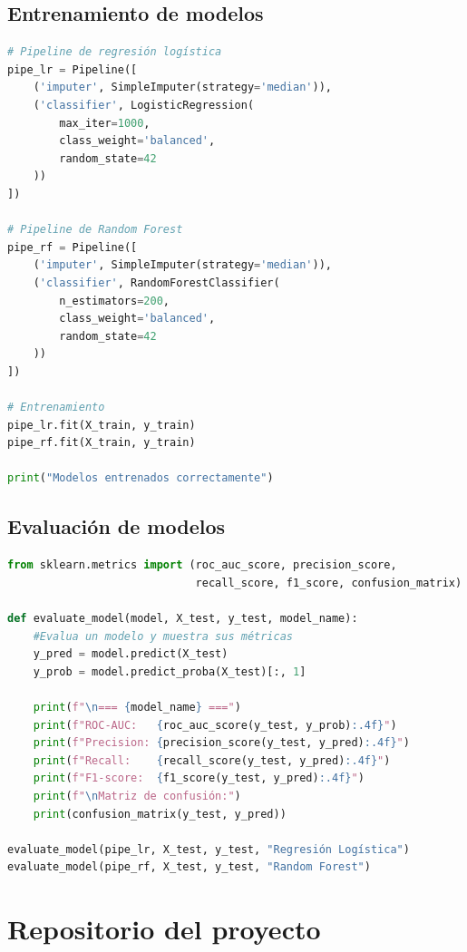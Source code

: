 \documentclass[12pt, a4paper, oneside]{report}
\begin{document}
\section{Entrenamiento de modelos}

\begin{lstlisting}[language=Python, caption=Configuración y entrenamiento de los modelos]
# Pipeline de regresión logística
pipe_lr = Pipeline([
    ('imputer', SimpleImputer(strategy='median')),
    ('classifier', LogisticRegression(
        max_iter=1000,
        class_weight='balanced',
        random_state=42
    ))
])

# Pipeline de Random Forest
pipe_rf = Pipeline([
    ('imputer', SimpleImputer(strategy='median')),
    ('classifier', RandomForestClassifier(
        n_estimators=200,
        class_weight='balanced',
        random_state=42
    ))
])

# Entrenamiento
pipe_lr.fit(X_train, y_train)
pipe_rf.fit(X_train, y_train)

print("Modelos entrenados correctamente")
\end{lstlisting}

\section{Evaluación de modelos}

\begin{lstlisting}[language=Python, caption=Cálculo de métricas de evaluación]
from sklearn.metrics import (roc_auc_score, precision_score,
                             recall_score, f1_score, confusion_matrix)

def evaluate_model(model, X_test, y_test, model_name):
    #Evalua un modelo y muestra sus métricas
    y_pred = model.predict(X_test)
    y_prob = model.predict_proba(X_test)[:, 1]
    
    print(f"\n=== {model_name} ===")
    print(f"ROC-AUC:   {roc_auc_score(y_test, y_prob):.4f}")
    print(f"Precision: {precision_score(y_test, y_pred):.4f}")
    print(f"Recall:    {recall_score(y_test, y_pred):.4f}")
    print(f"F1-score:  {f1_score(y_test, y_pred):.4f}")
    print(f"\nMatriz de confusión:")
    print(confusion_matrix(y_test, y_pred))

evaluate_model(pipe_lr, X_test, y_test, "Regresión Logística")
evaluate_model(pipe_rf, X_test, y_test, "Random Forest")
\end{lstlisting}


\chapter{Repositorio del proyecto}
\label{anexo:repositorio}
\end{document}
